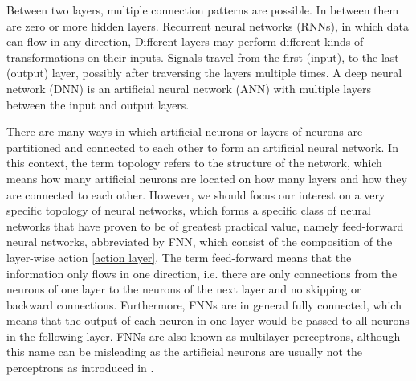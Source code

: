 Between two layers, multiple connection patterns are possible.
In between them are zero or more hidden layers.
Recurrent neural networks (RNNs), in which data can flow in any direction,
Different layers may perform different kinds of transformations on their inputs. Signals travel from the first (input), to the last (output) layer, possibly after traversing the layers multiple times.
A deep neural network (DNN) is an artificial neural network (ANN) with multiple layers between the input and output layers.

There are many ways in which artificial neurons or layers of neurons are partitioned and connected to each other to form an artificial neural network. In this context, the term topology refers to the structure of the network, which means how many artificial neurons are located on how many layers and how they are connected to each other. However, we should focus our interest on a very specific topology of neural networks, which forms a specific class of neural networks that have proven to be of greatest practical value, namely feed-forward neural networks, abbreviated by FNN, which consist of the composition of the layer-wise action \cref{action layer}. The term feed-forward means that the information only flows in one direction, i.e. there are only connections from the neurons of one layer to the neurons of the next layer and no skipping or backward connections. Furthermore, FNNs are in general fully connected, which means that the output of each neuron in one layer would be passed to all neurons in the following layer. FNNs are also known as multilayer perceptrons, although this name can be misleading as the artificial neurons are usually not the perceptrons as introduced in \cite{Rosenblatt:1958}. \\



